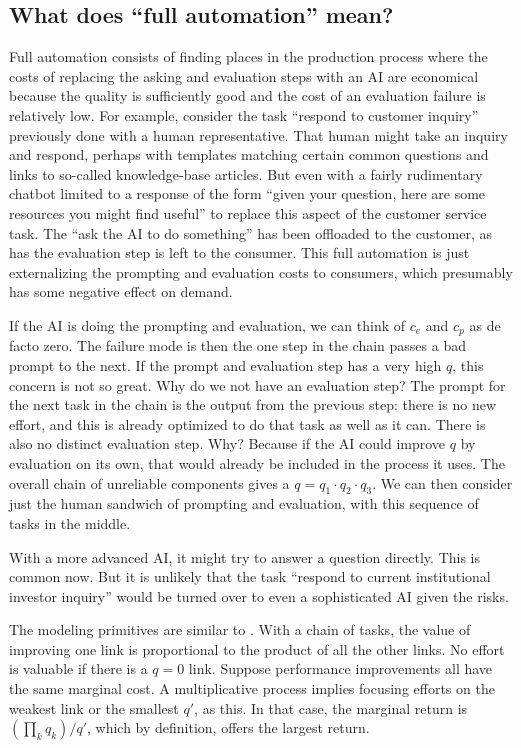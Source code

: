 \documentclass{article}
\begin{document}
\subsection{What does ``full automation'' mean?}
Full automation consists of finding places in the production process where the costs of replacing the asking and evaluation steps with an AI are economical because the quality is sufficiently good and the cost of an evaluation failure is relatively low. 
For example, consider the task ``respond to customer inquiry'' previously done with a human representative. 
That human might take an inquiry and respond, perhaps with templates matching certain common questions and links to so-called knowledge-base articles. 
But even with a fairly rudimentary chatbot limited to a response of the form ``given your question, here are some resources you might find useful'' to replace this aspect of the customer service task.
The ``ask the AI to do something'' has been offloaded to the customer, as has the evaluation step is left to the consumer.
This full automation is just externalizing the prompting and evaluation costs to consumers, which presumably has some negative effect on demand.  

If the AI is doing the prompting and evaluation, we can think of $c_e$ and $c_p$ as de facto zero.
The failure mode is then the one step in the chain passes a bad prompt to the next. 
If the prompt and evaluation step has a very high $q$, this concern is not so great. 
Why do we not have an evaluation step? 
The prompt for the next task in the chain is the output from the previous step: there is no new effort, and this is already optimized to do that task as well as it can. 
There is also no distinct evaluation step. Why? 
Because if the AI could improve $q$ by evaluation on its own, that would already be included in the process it uses. 
The overall chain of unreliable components gives a $q = q_1 \cdot q_2 \cdot q_3$.
We can then consider just the human sandwich of prompting and evaluation, with this sequence of tasks in the middle.  

With a more advanced AI, it might try to answer a question directly.
This is common now. 
But it is unlikely that the task ``respond to current institutional investor inquiry'' would be turned over to even a sophisticated AI given the risks.

The modeling primitives are similar to \cite{kremer1993}.
With a chain of tasks, the value of improving one link is proportional to the product of all the other links.
No effort is valuable if there is a $q = 0$ link.
Suppose performance improvements all have the same marginal cost. 
A multiplicative process implies focusing efforts on the weakest link or the smallest $q'$, as this. 
In that case, the marginal return is $(\prod_k q_k)/q'$, which by definition, offers the largest return.
\end{document}

